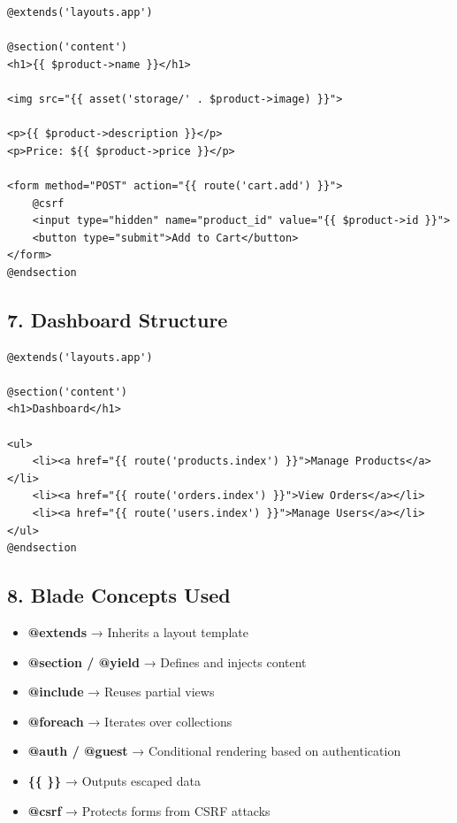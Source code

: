 \documentclass[12pt,a4paper]{article}
\begin{document}
\begin{verbatim}
@extends('layouts.app')

@section('content')
<h1>{{ $product->name }}</h1>

<img src="{{ asset('storage/' . $product->image) }}">

<p>{{ $product->description }}</p>
<p>Price: ${{ $product->price }}</p>

<form method="POST" action="{{ route('cart.add') }}">
    @csrf
    <input type="hidden" name="product_id" value="{{ $product->id }}">
    <button type="submit">Add to Cart</button>
</form>
@endsection
\end{verbatim}

\subsection{7. Dashboard Structure}

\begin{verbatim}
@extends('layouts.app')

@section('content')
<h1>Dashboard</h1>

<ul>
    <li><a href="{{ route('products.index') }}">Manage Products</a></li>
    <li><a href="{{ route('orders.index') }}">View Orders</a></li>
    <li><a href="{{ route('users.index') }}">Manage Users</a></li>
</ul>
@endsection
\end{verbatim}

\subsection{8. Blade Concepts Used}

\begin{itemize}[noitemsep]
    \item \textbf{@extends} → Inherits a layout template
    \item \textbf{@section / @yield} → Defines and injects content
    \item \textbf{@include} → Reuses partial views
    \item \textbf{@foreach} → Iterates over collections
    \item \textbf{@auth / @guest} → Conditional rendering based on authentication
    \item \textbf{\{\{ \}\}} → Outputs escaped data
    \item \textbf{@csrf} → Protects forms from CSRF attacks
\end{itemize}
\end{document}
